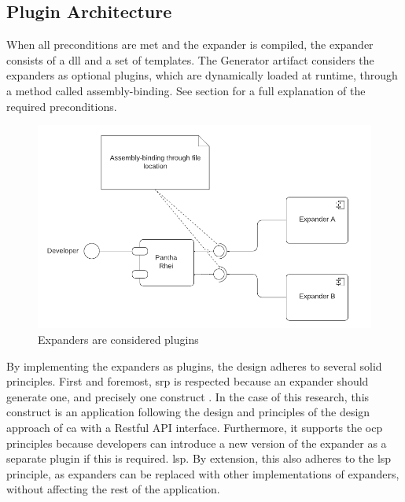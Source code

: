 \subsection{Plugin Architecture} \label{subsec_plugin_architecture}

When all preconditions are met and the expander is compiled, the expander consists of a
\gls{dll} and a set of templates. The Generator artifact considers the expanders as
optional plugins, which are dynamically loaded at runtime, through a method called
assembly-binding. See section  for a full explanation of the
required preconditions.

\begin{figure}[H]
  \centering
  \includegraphics[width=1\textwidth]{Figures/plugin_architecture.pdf}
  \caption[Plugin Archticture]{Expanders are considered plugins}
  \label{fi:plugin_architecture}
\end{figure}

By implementing the expanders as plugins, the design adheres to several \gls{solid}
principles. First and foremost, \gls{srp} is respected because an expander should generate
one, and precisely one construct \parencite[403]{mannaert_normalized_2016}. In the case of
this research, this construct is an application following the design and principles of the
design approach of \gls{ca} with a Restful API interface. Furthermore, it supports the
\gls{ocp} principles because developers can introduce a new version of the expander as a
separate plugin if this is required. \gls{lsp}. By extension, this also adheres to the
\gls{lsp} principle, as expanders can be replaced with other implementations of expanders,
without affecting the rest of the application.